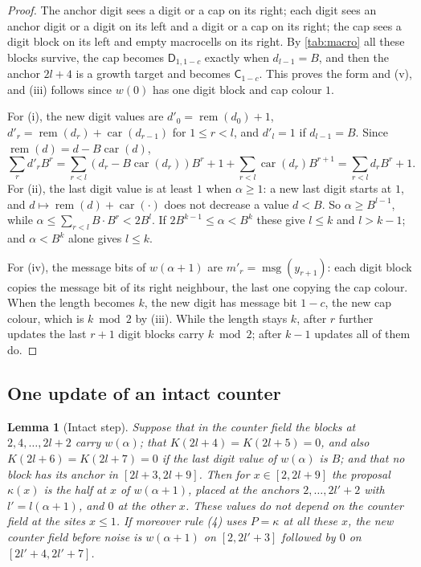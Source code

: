 \documentclass[11pt]{article}
\theoremstyle{plain}
\newtheorem{lemma}[theorem]{Lemma}
\theoremstyle{definition}
\theoremstyle{remark}
\newcommand{\mD}{\mathsf D}
\newcommand{\mC}{\mathsf C}
\newcommand{\msg}{\operatorname{msg}}
\newcommand{\rem}{\operatorname{rem}}
\newcommand{\car}{\operatorname{car}}
\begin{document}
\begin{proof}
The anchor digit sees a digit or a cap on its right; each digit sees an anchor digit or a digit on its left and a digit or a cap on its right; the cap sees a digit block on its left and empty macrocells on its right. By \cref{tab:macro} all these blocks survive, the cap becomes $\mD_{1,1-c}$ exactly when $d_{l-1}=B$, and then the anchor $2l+4$ is a growth target and becomes $\mC_{1-c}$. This proves the form and (v), and (iii) follows since $w(0)$ has one digit block and cap colour $1$.

For (i), the new digit values are $d'_0=\rem(d_0)+1$, $d'_r=\rem(d_r)+\car(d_{r-1})$ for $1\le r<l$, and $d'_l=1$ if $d_{l-1}=B$. Since $\rem(d)=d-B\car(d)$,
\[
\sum_r d'_rB^r=\sum_{r<l}(d_r-B\car(d_r))B^r+1+\sum_{r<l}\car(d_r)B^{r+1}=\sum_{r<l}d_rB^r+1 .
\]
For (ii), the last digit value is at least $1$ when $\alpha\ge1$: a new last digit starts at $1$, and $d\mapsto\rem(d)+\car(\cdot)$ does not decrease a value $d<B$. So $\alpha\ge B^{l-1}$, while $\alpha\le\sum_{r<l}B\cdot B^r<2B^l$. If $2B^{k-1}\le\alpha<B^k$ these give $l\le k$ and $l>k-1$; and $\alpha<B^k$ alone gives $l\le k$.

For (iv), the message bits of $w(\alpha+1)$ are $m'_r=\msg(y_{r+1})$: each digit block copies the message bit of its right neighbour, the last one copying the cap colour. When the length becomes $k$, the new digit has message bit $1-c$, the new cap colour, which is $k\bmod2$ by (iii). While the length stays $k$, after $r$ further updates the last $r+1$ digit blocks carry $k\bmod2$; after $k-1$ updates all of them do.
\end{proof}

\subsection{One update of an intact counter}

\begin{lemma}[Intact step]\label{lem:intact}
Suppose that in the counter field the blocks at $2,4,\dots,2l+2$ carry $w(\alpha)$; that $K(2l+4)=K(2l+5)=0$, and also $K(2l+6)=K(2l+7)=0$ if the last digit value of $w(\alpha)$ is $B$; and that no block has its anchor in $[2l+3,2l+9]$. Then for $x\in[2,2l+9]$ the proposal $\kappa(x)$ is the half at $x$ of $w(\alpha+1)$, placed at the anchors $2,\dots,2l'+2$ with $l'=l(\alpha+1)$, and $0$ at the other $x$. These values do not depend on the counter field at the sites $x\le1$. If moreover rule (4) uses $P=\kappa$ at all these $x$, the new counter field before noise is $w(\alpha+1)$ on $[2,2l'+3]$ followed by $0$ on $[2l'+4,2l'+7]$.
\end{lemma}
\end{document}
